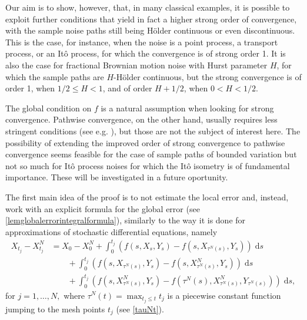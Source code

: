 \documentclass[reqno,12pt]{amsart}
\theoremstyle{plain} %
\theoremstyle{definition} %
\begin{document}
Our aim is to show, however, that, in many classical examples, it is possible to exploit further conditions that yield in fact a higher strong order of convergence, with the sample noise paths still being H\"older continuous or even discontinuous. This is the case, for instance, when the noise is a point process, a transport process, or an It\^o process, for which the convergence is of strong order 1. It is also the case for fractional Brownian motion noise with Hurst parameter $H$, for which the sample paths are $H$-H\"older continuous, but the strong convergence is of order 1, when $1/2 \leq H < 1$, and of order $H + 1/2$, when $0 < H < 1/2$.

The global condition on $f$ is a natural assumption when looking for strong convergence. Pathwise convergence, on the other hand, usually requires less stringent conditions (see e.g. \cite{JentzenKloedenNeuenkirch2009, JentzenKloeden2011}), but those are not the subject of interest here. The possibility of extending the improved order of strong convergence to pathwise convergence seems feasible for the case of sample paths of bounded variation but not so much for It\^o process noises for which the It\^o isometry is of fundamental importance. These will be investigated in a future oportunity.

The first main idea of the proof is to not estimate the local error and, instead, work with an explicit formula for the global error (see \cref{lemglobalerrorintegralformula}), similarly to the way it is done for approximations of stochastic differential equations, namely
\begin{equation}
    \label{lemglobalerrorintegralformulaintro}
    \begin{aligned}
        X_{t_j} - X_{t_j}^N & = X_0 - X_0^N + \int_0^{t_j} \left( f(s, X_s, Y_s) - f(s, X_{\tau^N(s)}, Y_s) \right)\;\mathrm{d}s  \\ 
        & \qquad + \int_{0}^{t_j} \left( f(s, X_{\tau^N(s)}, Y_s) - f(s, X_{\tau^N(s)}^N, Y_s) \right)\;\mathrm{d}s \\
        & \qquad + \int_0^{t_j} \left( f(s, X_{\tau^N(s)}^N, Y_s) - f(\tau^N(s), X_{\tau^N(s)}^N, Y_{\tau^N(s)}) \right)\;\mathrm{d}s,
    \end{aligned}
\end{equation}
for $j = 1, \ldots, N,$ where $\tau^N(t) = \max_{t_j \leq t} t_j$ is a piecewise constant function jumping to the mesh points $t_j$ (see \eqref{tauNt}).
\end{document}
